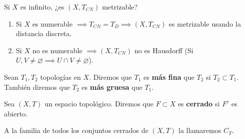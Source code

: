 Si $X$ es infinito, ¿es $(X, T_{CN})$ metrizable?
\begin{enumerate}
  \item Si $X$ es numerable $\implies T_{CN} = T_D \implies (X,T_{CN})$ es metrizable usando la distancia discreta.
  \item Si $X$ no es numerable $\implies (X,T_{CN})$ no es Hausdorff (Si $U,V \neq \varnothing \implies U \cap V \neq \varnothing $).
\end{enumerate}

\begin{ndef}
  Sean $T_1,T_2$ topologías en $X$. Diremos que $T_1$ es \textbf{más fina} que $T_2$ si $T_2 \subset T_1$. También diremos que $T_2$ es \textbf{más gruesa} que $T_1$.
\end{ndef}

\begin{ndef}
  Sea $(X,T)$ un espacio topológico. Diremos que $F \subset X$ es \textbf{cerrado} si $F^c$ es abierto.
\end{ndef}
\begin{note}
    A la familia de todos los conjuntos cerrados de $(X,T)$ la llamaremos $C_T$.
\end{note}

